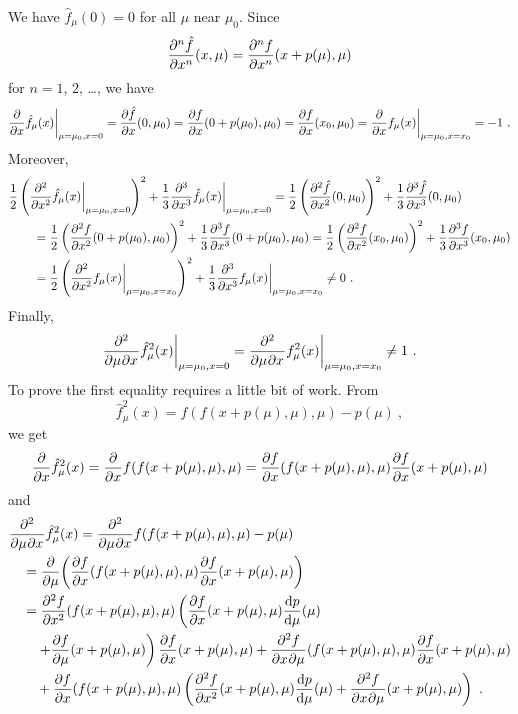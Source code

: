 \begin{rmk}
We have $\hat{f}_\mu(0)=0$ for all $\mu$ near $\mu_0$.  Since
\[
  \pdydxn{\hat{f}}{x}{n}(x,\mu) = \pdydxn{f}{x}{n}(x+p(\mu),\mu)
\]
for $n=1$, $2$, \ldots, we have
\[
\pdfdx{\hat{f}_{\mu}(x)}{x}\bigg|_{\mu=\mu_0,x=0}
= \pdydx{\hat{f}}{x}(0,\mu_0)
= \pdydx{f}{x}(0+p(\mu_0),\mu_0)
= \pdydx{f}{x}(x_0,\mu_0)
= \pdfdx{f_{\mu}(x)}{x} \bigg|_{\mu=\mu_0,x=x_0} = -1 \ .
\]
Moreover,
\begin{align*}
&\frac{1}{2}
\left(\pdfdxn{\hat{f}_{\mu}(x)}{x}{2}\bigg|_{\mu=\mu_0,x=0}\right)^2
+\frac{1}{3} \pdfdxn{\hat{f}_{\mu}(x)}{x}{3}\bigg|_{\mu=\mu_0,x=0}
= 
\frac{1}{2} \left(\pdydxn{\hat{f}}{x}{2}(0,\mu_0) \right)^2
+\frac{1}{3} \pdydxn{\hat{f}}{x}{3}(0,\mu_0) \\
&\qquad = \frac{1}{2} \left(\pdydxn{f}{x}{2}(0+p(\mu_0),\mu_0) \right)^2
+\frac{1}{3} \pdydxn{f}{x}{3}(0+p(\mu_0),\mu_0)
= \frac{1}{2} \left(\pdydxn{f}{x}{2}(x_0,\mu_0) \right)^2
+\frac{1}{3} \pdydxn{f}{x}{3}(x_0,\mu_0) \\
&\qquad =\frac{1}{2}
\left(\pdfdxn{f_{\mu}(x)}{x}{2}\bigg|_{\mu=\mu_0,x=x_0}\right)^2
+\frac{1}{3} \pdfdxn{f_{\mu}(x)}{x}{3}\bigg|_{\mu=\mu_0,x=x_0} \neq 0 \ .
\end{align*}
Finally,
\begin{equation}\label{per_db_sc}
\pdfdxnm{\hat{f}_{\mu}^2(x)}{\mu}{x}{2}{}{}\bigg|_{\mu=\mu_0,x=0}
= \pdfdxnm{f_{\mu}^2(x)}{\mu}{x}{2}{}{}\bigg|_{\mu=\mu_0,x=x_0} \neq 1 \ .
\end{equation}
To prove the first equality requires a little bit of work.  From
\[
\hat{f}_{\mu}^2(x) = f(f(x+p(\mu),\mu),\mu)-p(\mu) \  ,
\]
we get
\[
\pdfdx{\hat{f}_{\mu}^2(x)}{x} = \pdfdx{f(f(x+p(\mu),\mu),\mu)}{x} 
= \pdydx{f}{x}(f(x+p(\mu),\mu),\mu) \pdydx{f}{x}(x+p(\mu),\mu)
\]
and
\begin{align*}
&\pdfdxnm{\hat{f}_{\mu}^2(x)}{\mu}{x}{2}{}{} =
\pdfdxnm{f(f(x+p(\mu),\mu),\mu)-p(\mu)}{\mu}{x}{2}{}{} \\
&\quad = \pdfdx{\left( \pdydx{f}{x}(f(x+p(\mu),\mu),\mu)
\pdydx{f}{x}(x+p(\mu),\mu) \right)}{\mu}  \\
&\quad = \pdydxn{f}{x}{2}(f(x+p(\mu),\mu),\mu)
\left( \pdydx{f}{x}(x+p(\mu),\mu) \dydx{p}{\mu} (\mu) \right. \\
&\qquad \left. + \pdydx{f}{\mu}(x+p(\mu),\mu) \right)
\pdydx{f}{x}(x+p(\mu),\mu)
+ \pdydxnm{f}{x}{\mu}{2}{}{}(f(x+p(\mu),\mu),\mu)
\pdydx{f}{x}(x+p(\mu),\mu)\\
&\qquad +\pdydx{f}{x}(f(x+p(\mu),\mu),\mu)
\left( \pdydxn{f}{x}{2}(x+p(\mu),\mu) \dydx{p}{\mu}(\mu)
+ \pdydxnm{f}{x}{\mu}{2}{}{}(x+p(\mu),\mu) \right) \ .

\end{align*}
\end{rmk}
